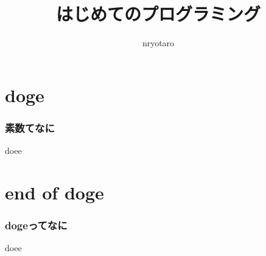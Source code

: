 \documentclass[unicode]{beamer}
\title{はじめてのプログラミング}
\author{nryotaro}
\institute{doge}
\begin{document}
\begin{frame}
\titlepage
\end{frame}
\section{doge}
\begin{frame}
\frametitle{素数てなに}
doee
\end{frame}
\section{end of doge}
\begin{frame}[t]
\frametitle{dogeってなに}
doee
\end{frame}
\end{document}
